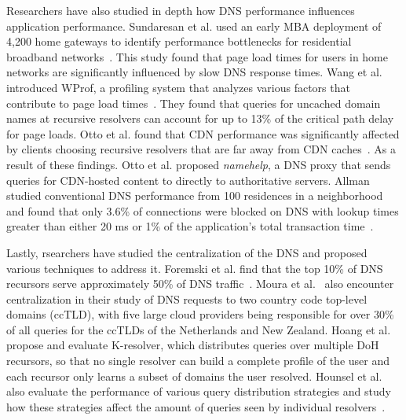 Researchers have also studied in depth how DNS performance influences application performance.
Sundaresan et al. used an early MBA deployment of 4,200 home gateways to identify performance bottlenecks for residential broadband networks~\cite{sundaresan2013measuring}.
This study found that page load times for users in home networks are significantly influenced by slow DNS response times.
Wang et al. introduced WProf, a profiling system that analyzes various factors that contribute to page load times~\cite{wang2013demystifying}.
They found that queries for uncached domain names at recursive resolvers can account for up to 13\% of the critical path delay for page loads.
Otto et al. found that CDN performance was significantly affected by clients choosing recursive resolvers that are far away from CDN caches~\cite{otto2012content}.
As a result of these findings. Otto et al. proposed \textit{namehelp}, a DNS proxy that sends queries for CDN-hosted content to directly to authoritative servers.
Allman studied conventional DNS performance from 100 residences in a neighborhood and found that only 3.6\% of connections were blocked on DNS with lookup times greater than either 20 ms or 1\% of the application's total transaction time~\cite{allman2020putting}.

Lastly, rsearchers have studied the centralization of the DNS and proposed various techniques to address it.
Foremski et al. find that the top 10\% of DNS recursors serve approximately 50\% of DNS traffic~\cite{foremski2019dns-observatory}.
Moura et al.~\cite{moura2020clouding} also encounter centralization in their study of DNS requests to two country code top-level domains (ccTLD), with five large cloud providers being responsible for over 30\% of all queries for the ccTLDs of the Netherlands and New Zealand.
Hoang et al.~\cite{hoang2020kresolver} propose and evaluate K-resolver, which distributes queries over multiple DoH recursors, so that no single resolver can build a complete profile of the user and each recursor only learns a subset of domains the user resolved.
Hounsel et al. also evaluate the performance of various query distribution strategies and study how these strategies affect the amount of queries seen by individual resolvers~\cite{hounsel2021multi}.
